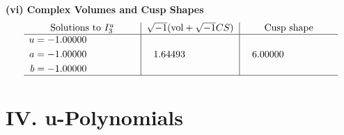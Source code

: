 \documentclass[1p]{elsarticle_modified}
\theoremstyle{definition}
\newcommand{\I}{\sqrt{-1}}
\begin{document}
\newpage\flushleft \textbf{(vi) Complex Volumes and Cusp Shapes}
$$\begin{array}{c|c|c}  
\text{Solutions to }I^u_{3}& \I (\text{vol} + \sqrt{-1}CS) & \text{Cusp shape}\\
 \hline 
\begin{aligned}
u &= -1.00000\phantom{ +0.000000I} \\
a &= -1.00000\phantom{ +0.000000I} \\
b &= -1.00000\phantom{ +0.000000I}\end{aligned}
 & \phantom{-}1.64493\phantom{ +0.000000I} & \phantom{-}6.00000\phantom{ +0.000000I}\\
 \hline 
 \end{array}$$\newpage
\newpage\renewcommand{\arraystretch}{1}
\centering \section*{ IV. u-Polynomials}
\end{document}
